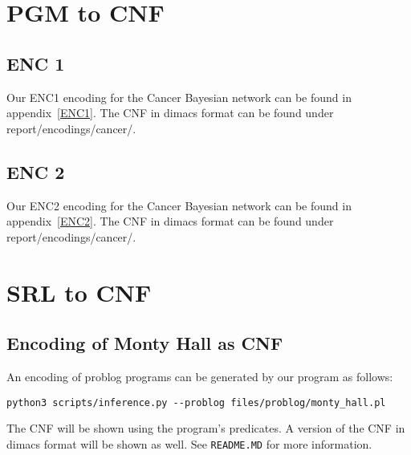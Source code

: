 \section{PGM to CNF}

\subsection{ENC 1}
Our ENC1 encoding for the Cancer Bayesian network can be found in appendix~\ref{ENC1}. The CNF in dimacs format can be found under report/encodings/cancer/.

\subsection{ENC 2}
Our ENC2 encoding for the Cancer Bayesian network can be found in appendix~\ref{ENC2}. The CNF in dimacs format can be found under report/encodings/cancer/.



\section{SRL to CNF}
\subsection{Encoding of Monty Hall as CNF}
An encoding of problog programs can be generated by our program as follows:
\begin{lstlisting}
python3 scripts/inference.py --problog files/problog/monty_hall.pl
\end{lstlisting}
The CNF will be shown using the program's predicates. A version of the CNF in dimacs format will be shown as well.
See \texttt{README.MD} for more information.

